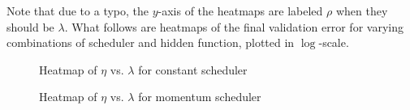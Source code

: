 \documentclass{article}
\theoremstyle{definition}
\begin{document}
Note that due to a typo, the $y$-axis of the heatmaps are labeled $\rho$ when they should be $\lambda$. What follows are heatmaps of the final validation error for varying combinations of scheduler and hidden function, plotted in $\log$-scale.
\begin{figure}[H]%
    \centering
    \qquad
    \caption{Heatmap of $\eta$ vs. $\lambda$ for constant scheduler}%
    \label{fig:FrankeConstant}%
\end{figure}

\begin{figure}[H]%
    \centering
    \qquad
    \caption{Heatmap of $\eta$ vs. $\lambda$ for momentum scheduler}%
    \label{fig:FrankeMomentum}%
\end{figure}
\end{document}
